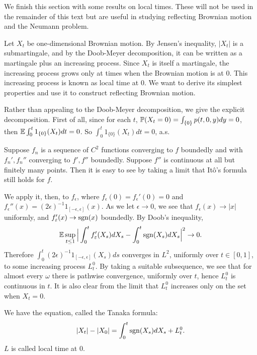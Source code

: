 
We finish this section with some results on local times. These will not be used in the remainder of this text but are useful in studying reflecting Brownian motion and the Neumann problem.

Let $X_t$ be one-dimensional Brownian motion. By Jensen's inequality, $|X_t|$ is a submartingale, and by the Doob-Meyer decomposition, it can be written as a martingale plus an increasing process. Since $X_t$ is itself a martingale, the increasing process grows only at times when the Brownian motion is at $0$. This increasing process is known as local time at $0$. We want to derive its simplest properties and use it to construct reflecting Brownian motion.

Rather than appealing to the Doob-Meyer decomposition, we give the explicit decomposition. First of all, since for each $t$, $\P(X_t = 0) = \int_{\{0\}} p(t,0,y)dy = 0$, then $\E \int_0^t 1_{\{0\}}(X_t)dt = 0$. So $\int_0^t 1_{\{0\}}(X_t)dt = 0$, a.s.

Suppose $f_n$ is a sequence of $C^2$ functions converging to $f$ boundedly and with $f_n', f_n''$ converging to $f', f''$ boundedly. Suppose $f''$ is continuous at all but finitely many points. Then it is easy to see by taking a limit that It\^o's formula still holds for $f$.

We apply it, then, to $f_\epsilon$, where $f_\epsilon(0) = f_\epsilon'(0) = 0$ and $f_\epsilon''(x) = (2\epsilon)^{-1}1_{[-\epsilon,\epsilon]}(x)$. As we let $\epsilon \to 0$, we see that $f_\epsilon(x) \to |x|$ uniformly, and $f'_\epsilon(x)\to \sgn(x)$ boundedly. By Doob's inequality,
\[
    \E \sup_{t\le 1}\Big|\int_0^t f'_\epsilon(X_s)dX_s-\int_0^t \sgn(X_s)dX_s\Big|^2\to 0.
\]
Therefore $\int_0^t (2\epsilon)^{-1}1_{[-\epsilon,\epsilon]}(X_s)ds$ converges in $L^2$, uniformly over $t\in[0,1]$, to some increasing process $L_t^0$. By taking a suitable subsequence, we see that for almost every $\omega$ there is pathwise convergence, uniformly over $t$, hence $L_t^0$ is continuous in $t$. It is also clear from the limit that $L_t^0$ increases
only on the set when $X_t = 0$.

We have the equation, called the Tanaka formula:
\begin{equation}\label{eq:ch1_6.30}
|X_t| - |X_0| = \int_0^t \sgn(X_s)dX_s + L_t^0.
\end{equation}
$L$ is called local time at $0$.

